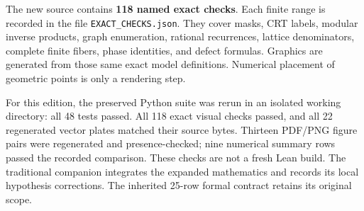 The new source contains \textbf{118 named exact checks}. Each finite range is recorded in the file \texttt{EXACT\_CHECKS.json}. They cover masks, CRT labels, modular inverse products, graph enumeration, rational recurrences, lattice denominators, complete finite fibers, phase identities, and defect formulas. Graphics are generated from those same exact model definitions. Numerical placement of geometric points is only a rendering step.

For this edition, the preserved Python suite was rerun in an isolated working directory: all 48 tests passed. All 118 exact visual checks passed, and all 22 regenerated vector plates matched their source bytes. Thirteen PDF/PNG figure pairs were regenerated and presence-checked; nine numerical summary rows passed the recorded comparison. These checks are not a fresh Lean build. The traditional companion integrates the expanded mathematics and records its local hypothesis corrections. The inherited 25-row formal contract retains its original scope.

